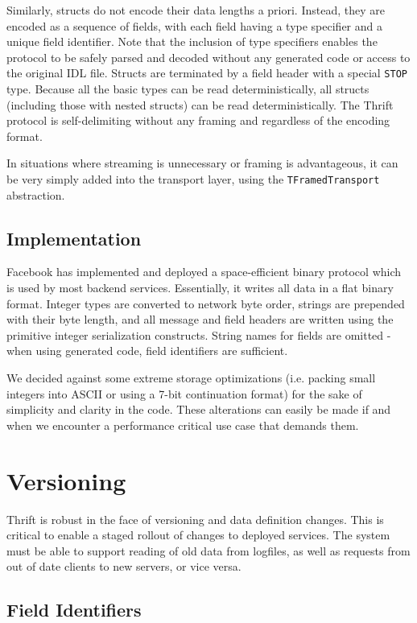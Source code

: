 \documentclass[nocopyrightspace,blockstyle]{sigplanconf}
\begin{document}
Similarly, structs do not encode their data lengths a priori. Instead, they are
encoded as a sequence of fields, with each field having a type specifier and a
unique field identifier. Note that the inclusion of type specifiers enables
the protocol to be safely parsed and decoded without any generated code
or access to the original IDL file. Structs are terminated by a field header
with a special \texttt{STOP} type. Because all the basic types can be read
deterministically, all structs (including those with nested structs) can be
read deterministically. The Thrift protocol is self-delimiting without any
framing and regardless of the encoding format.

In situations where streaming is unnecessary or framing is advantageous, it
can be very simply added into the transport layer, using the
\texttt{TFramedTransport} abstraction.

\subsection{Implementation}

Facebook has implemented and deployed a space-efficient binary protocol which
is used by most backend services. Essentially, it writes all data
in a flat binary format. Integer types are converted to network byte order,
strings are prepended with their byte length, and all message and field headers
are written using the primitive integer serialization constructs. String names
for fields are omitted - when using generated code, field identifiers are
sufficient.

We decided against some extreme storage optimizations (i.e. packing
small integers into ASCII or using a 7-bit continuation format) for the sake
of simplicity and clarity in the code. These alterations can easily be made
if and when we encounter a performance critical use case that demands them.

\section{Versioning}

Thrift is robust in the face of versioning and data definition changes. This
is critical to enable a staged rollout of changes to deployed services. The
system must be able to support reading of old data from logfiles, as well as
requests from out of date clients to new servers, or vice versa.

\subsection{Field Identifiers}
\end{document}
